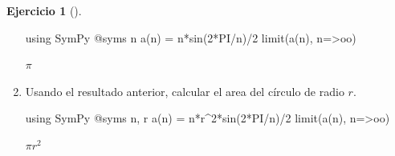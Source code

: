 \documentclass[
  a4paper,
]{scrreport}
\newenvironment{Shaded}{\begin{snugshade}}{\end{snugshade}}
\newcommand{\BuiltInTok}[1]{\textcolor[rgb]{0.00,0.23,0.31}{#1}}
\newcommand{\FloatTok}[1]{\textcolor[rgb]{0.68,0.00,0.00}{#1}}
\newcommand{\FunctionTok}[1]{\textcolor[rgb]{0.28,0.35,0.67}{#1}}
\newcommand{\ImportTok}[1]{\textcolor[rgb]{0.00,0.46,0.62}{#1}}
\newcommand{\NormalTok}[1]{\textcolor[rgb]{0.00,0.23,0.31}{#1}}
\newcommand{\OperatorTok}[1]{\textcolor[rgb]{0.37,0.37,0.37}{#1}}
\newcommand{\PreprocessorTok}[1]{\textcolor[rgb]{0.68,0.00,0.00}{#1}}
\theoremstyle{definition}
\newtheorem{exercise}{Ejercicio}[chapter]
\theoremstyle{remark}
\begin{document}
\begin{exercise}[]
\begin{enumerate}
\begin{tcolorbox}
\begin{Shaded}
\begin{Highlighting}[]
\ImportTok{using} \BuiltInTok{SymPy}
\PreprocessorTok{@syms}\NormalTok{ n}
\FunctionTok{a}\NormalTok{(n) }\OperatorTok{=} \FunctionTok{n*sin}\NormalTok{(}\FloatTok{2}\OperatorTok{*}\NormalTok{PI}\OperatorTok{/}\NormalTok{n)}\OperatorTok{/}\FloatTok{2}
\FunctionTok{limit}\NormalTok{(}\FunctionTok{a}\NormalTok{(n), n}\OperatorTok{=\textgreater{}}\NormalTok{oo)}
\end{Highlighting}
\end{Shaded}

  $\pi$

  \end{tcolorbox}
\item
  Usando el resultado anterior, calcular el area del círculo de radio
  \(r\).

  \begin{tcolorbox}[enhanced jigsaw, bottomtitle=1mm, rightrule=.15mm, left=2mm, colback=white, title=\textcolor{quarto-callout-tip-color}{\faLightbulb}\hspace{0.5em}{Solución}, bottomrule=.15mm, colframe=quarto-callout-tip-color-frame, toprule=.15mm, leftrule=.75mm, opacityback=0, coltitle=black, breakable, colbacktitle=quarto-callout-tip-color!10!white, arc=.35mm, toptitle=1mm, titlerule=0mm, opacitybacktitle=0.6]

\begin{Shaded}
\begin{Highlighting}[]
\ImportTok{using} \BuiltInTok{SymPy}
\PreprocessorTok{@syms}\NormalTok{ n, r}
\FunctionTok{a}\NormalTok{(n) }\OperatorTok{=}\NormalTok{ n}\OperatorTok{*}\NormalTok{r}\OperatorTok{\^{}}\FloatTok{2}\FunctionTok{*sin}\NormalTok{(}\FloatTok{2}\OperatorTok{*}\NormalTok{PI}\OperatorTok{/}\NormalTok{n)}\OperatorTok{/}\FloatTok{2}
\FunctionTok{limit}\NormalTok{(}\FunctionTok{a}\NormalTok{(n), n}\OperatorTok{=\textgreater{}}\NormalTok{oo)}
\end{Highlighting}
\end{Shaded}

  $\pi r^{2}$

  \end{tcolorbox}
\end{enumerate}

\end{exercise}
\end{document}
